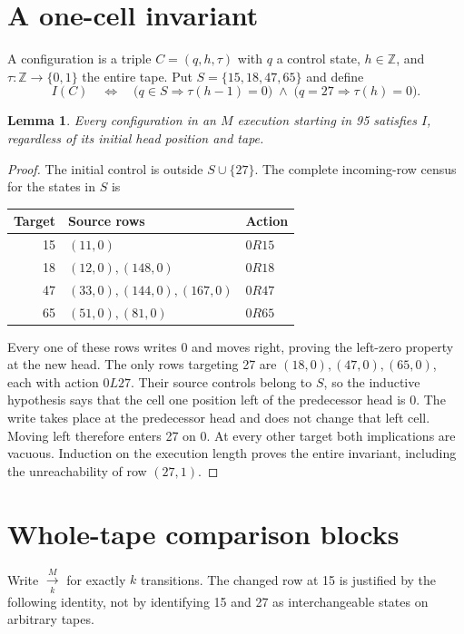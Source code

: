 \documentclass[11pt]{article}
\newtheorem{lemma}{Lemma}
\begin{document}
\section{A one-cell invariant}

A configuration is a triple $C=(q,h,\tau)$ with $q$ a control state,
$h\in\mathbb Z$, and $\tau:\mathbb Z\to\{0,1\}$ the entire tape.
Put $S=\{15,18,47,65\}$ and define
\[
 I(C)\quad\Longleftrightarrow\quad
 \bigl(q\in S\Longrightarrow\tau(h-1)=0\bigr)
 \;\land\;
 \bigl(q=27\Longrightarrow\tau(h)=0\bigr).
\]

\begin{lemma}
Every configuration in an $M$ execution starting in 95 satisfies $I$,
regardless of its initial head position and tape.
\end{lemma}
\begin{proof}
The initial control is outside $S\cup\{27\}$. The complete incoming-row
census for the states in $S$ is
\begin{center}
\begin{tabular}{rll}
\toprule
Target&Source rows&Action\\
\midrule
15&$(11,0)$&$0R15$\\
18&$(12,0),(148,0)$&$0R18$\\
47&$(33,0),(144,0),(167,0)$&$0R47$\\
65&$(51,0),(81,0)$&$0R65$\\
\bottomrule
\end{tabular}
\end{center}
Every one of these rows writes 0 and moves right, proving the left-zero
property at the new head. The only rows targeting 27 are
$(18,0),(47,0),(65,0)$, each with action $0L27$. Their source controls
belong to $S$, so the inductive hypothesis says that the cell one position
left of the predecessor head is 0. The write takes place at the predecessor
head and does not change that left cell. Moving left therefore enters 27
on 0. At every other target both implications are vacuous. Induction on
the execution length proves the entire invariant, including the
unreachability of row $(27,1)$.
\end{proof}

\section{Whole-tape comparison blocks}

Write $\xrightarrow[k]{M}$ for exactly $k$ transitions. The changed row
at 15 is justified by the following identity, not by identifying 15 and 27
as interchangeable states on arbitrary tapes.
\end{document}
